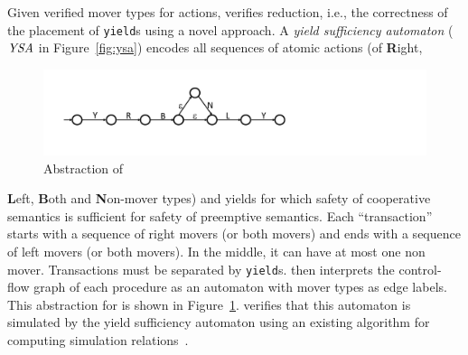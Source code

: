 Given verified mover types for actions, \civl verifies reduction, i.e., the correctness of the placement of {\tt yield}s using a novel  approach.
A {\em yield sufficiency automaton\/} ($\mathit{YSA}$ in Figure~\ref{fig:ysa})
encodes all sequences of atomic actions (of {\bf R}ight, 
\begin{figure}
\vspace*{-1cm}
\begin{center}
\includegraphics[scale=0.25]{WBSlow.pdf}
\end{center}
\vspace*{-0.5cm}
\caption{Abstraction of }
\label{fig:midwb}
\end{figure}
{\bf L}eft,
{\bf B}oth and
{\bf N}on-mover types)  and yields for which safety of cooperative semantics is sufficient 
for safety of preemptive semantics. 
Each ``transaction'' starts with a sequence of right movers (or both movers) and ends with a sequence of left movers (or both movers).
In the middle, it can have at most one non mover. Transactions must be
separated by {\tt yield}s.
\civl then interprets the control-flow graph of each procedure as an automaton with mover types as edge labels. 
This abstraction for  is shown in Figure~\ref{fig:midwb}.
\civl verifies that this automaton is simulated by the yield sufficiency automaton using an existing algorithm for computing simulation relations~\cite{HenzingerHK95}.


